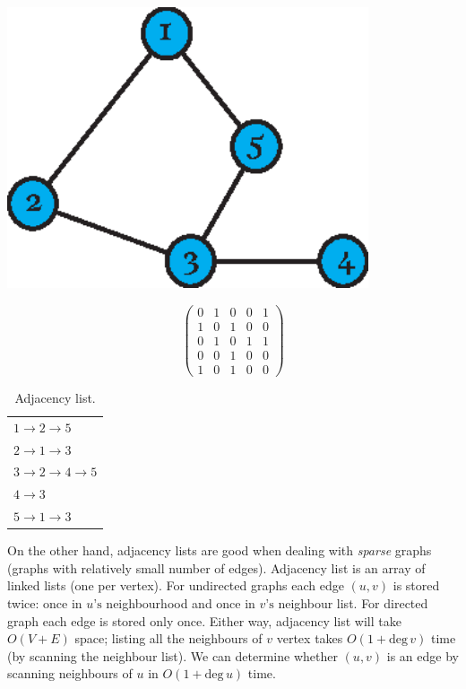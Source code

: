     \begin{table}[H]
        \centering
        \begin{minipage}[b]{0.3\textwidth}
          \centering
          \includegraphics[width=0.8\textwidth]{chapters/02_problem_definition/adjacency}
        \end{minipage}
        \quad
        \begin{minipage}[b]{0.33\textwidth}
          $$\begin{pmatrix}
            0 & 1 & 0 & 0 & 1 \\
            1 & 0 & 1 & 0 & 0 \\
            0 & 1 & 0 & 1 & 1 \\
            0 & 0 & 1 & 0 & 0 \\
            1 & 0 & 1 & 0 & 0
          \end{pmatrix}$$
        \end{minipage}
        \qquad
        \begin{minipage}[b]{0.27\textwidth}
          \begin{tabularx}{\textwidth}{L{1}}
            $1 \to 2 \to 5$ \\
            $2 \to 1 \to 3$ \\
            $3 \to 2 \to 4 \to 5$ \\
            $4 \to 3$ \\
            $5 \to 1 \to 3$
          \end{tabularx}
          \caption{Adjacency list.}
        \end{minipage}
      \end{table}

    On the other hand, adjacency lists are good when dealing with \emph{sparse} graphs (graphs with relatively small number of edges). Adjacency list is an array of linked lists (one per vertex). For undirected graphs each edge $(u, v)$ is stored twice: once in $u\mbox{'s}$ neighbourhood and once in $v\mbox{'s}$ neighbour list. For directed graph each edge is stored only once. Either way, adjacency list will take $O(V+E)$ space; listing all the neighbours of $v$ vertex takes $O(1+\mbox{deg}\,v)$ time (by scanning the neighbour list). We can determine whether $(u, v)$ is an edge by scanning neighbours of $u$ in $O(1+\mbox{deg}\,u)$ time.

